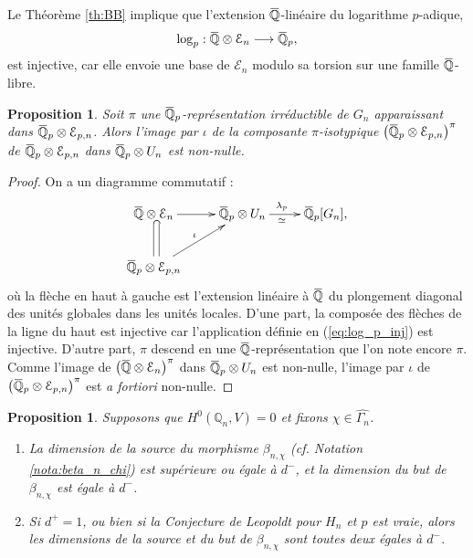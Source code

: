 \documentclass[12pt]{amsart}
\newcommand\bQ{\mathbb{Q}}
\newcommand\cE{\mathcal{E}}
\newcommand{\ob}[1]{\mkern 1.5mu\overline{\mkern-1.5mu#1\mkern-1.5mu}\mkern 1.5mu}
\theoremstyle{defstyle}
\theoremstyle{thmstyle}
\newtheorem{proposition}[subsubsection]{Proposition}
\begin{document}
Le Théorème \ref{th:BB} implique que l'extension $\ob{\bQ}$-linéaire du logarithme $p$-adique, 
\begin{equation}\label{eq:log_p_inj}
\log_p : \ob{\bQ} \otimes \cE_n \longrightarrow \ob{\bQ}_p,
\end{equation}
est injective, car elle envoie une base de $\cE_n$ modulo sa torsion sur une famille $\ob{\bQ}$-libre.

\begin{proposition}\label{prop:iota_non_nulle}
	Soit $\pi$ une $\ob{\bQ}_p$-représentation irréductible de $G_n$ apparaissant dans $\ob{\bQ}_p \otimes \cE_{p,n}$. Alors l'image par $\iota$ de la composante $\pi$-isotypique $\left(\ob{\bQ}_p \otimes \cE_{p,n}\right)^\pi$ de $\ob{\bQ}_p \otimes \cE_{p,n}$ dans $\ob{\bQ}_p \otimes U_n$ est non-nulle. 
\end{proposition}

\begin{proof}
	On a un diagramme commutatif :
	\[
	\xymatrix{ \ob{\bQ} \otimes \cE_{n} \ar[r] \ar@{^{(}-}[d]\ar@<1ex>@{-}[d] & \ob{\bQ}_p \otimes U_n \ar[r]^{\lambda_p\ }_{\simeq\ } &  \ob{\bQ}_p[G_n], \\ 
		\ob{\bQ}_p \otimes \cE_{p,n} \ar[ru]^{\iota} & & 
	}
	\]
	où la flèche en haut à gauche est l'extension linéaire à $\ob{\bQ}$ du plongement diagonal des unités globales dans les unités locales. D'une part, la composée des flèches de la ligne du haut est injective car l'application définie en (\ref{eq:log_p_inj}) est injective. D'autre part, $\pi$ descend en une $\ob{\bQ}$-représentation que l'on note encore $\pi$. Comme l'image de $\left(\ob{\bQ}\otimes \cE_{n}\right)^\pi$ dans $\ob{\bQ}_p \otimes U_n$ est non-nulle, l'image par $\iota$ de $\left(\ob{\bQ}_p\otimes \cE_{p,n}\right)^\pi$ est \textit{a fortiori} non-nulle.
\end{proof}

\begin{proposition}\label{prop:dim_source_but_beta} Supposons que $H^0(\bQ_n,V)=0$ et fixons $\chi \in \widehat{\Gamma_n}$.
\begin{enumerate}
	\item[(i)] La dimension de la source du morphisme $\beta_{n,\chi}$ (cf. Notation \ref{nota:beta_n_chi}) est supérieure ou égale à $d^-$, et la dimension du but de $\beta_{n,\chi}$ est égale à $d^-$.
	\item[(ii)] Si $d^+=1$, ou bien si la Conjecture de Leopoldt pour $H_n$ et $p$ est vraie, alors les dimensions de la source et du but de $\beta_{n,\chi}$ sont toutes deux égales à $d^-$.
\end{enumerate}
\end{proposition}
\end{document}
